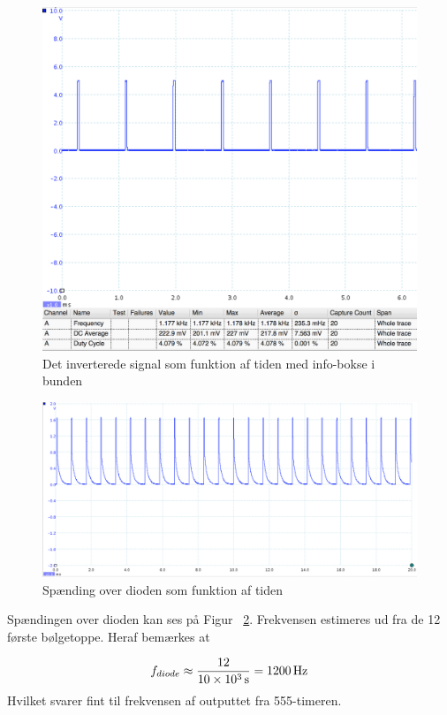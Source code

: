 \begin{figure}[H]
	\centering
    \includegraphics[width=13cm]{figures/2_4_3hastighed/555signalinv.png}
	\caption{Det inverterede signal som funktion af tiden med info-bokse i bunden}
	\label{fig:555inv}
\end{figure}

\begin{figure}[H]
	\centering
    \includegraphics[width=13cm]{figures/2_4_3hastighed/555timerDiode.png}
	\caption{Spænding over dioden som funktion af tiden}
	\label{fig:diodeafsender}
\end{figure}
Spændingen over dioden kan ses på Figur ~\ref{fig:diodeafsender}.
Frekvensen estimeres ud fra de 12 første bølgetoppe. Heraf bemærkes at 

\[
	f_{diode} \approx \frac{12}{\SI{10d3}{s}} = \SI{1200}{Hz}
\]
Hvilket svarer fint til frekvensen af outputtet fra 555-timeren.

